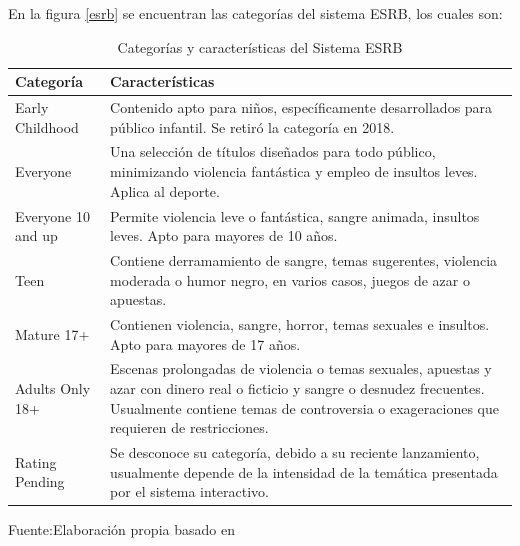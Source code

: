 En la figura \ref{esrb} se encuentran las categorías del sistema ESRB, los cuales son:
\begin{table}[t]
	\begin{center}
		\begin{tabular}{| m{4cm} | m{10cm} | }
			\hline Categoría & Características \\ \hline
			Early Childhood & Contenido apto para niños, específicamente desarrollados para
			público infantil. Se retiró la categoría en 2018. \\ \hline
			Everyone & Una selección de títulos diseñados para todo público, minimizando
			violencia fantástica y empleo de insultos leves. Aplica al deporte. \\ \hline
			Everyone 10 and up & Permite violencia leve o fantástica, sangre animada, insultos leves. Apto para mayores de 10 años. \\ \hline
			Teen & Contiene derramamiento de sangre, temas sugerentes, violencia moderada
			o humor negro, en varios casos, juegos de azar o apuestas. \\ \hline
			Mature 17+ & Contienen violencia, sangre, horror, temas sexuales e insultos. Apto
			para mayores de 17 años. \\ \hline
			Adults Only 18+ & Escenas prolongadas de violencia o temas sexuales, apuestas y
			azar con dinero real o ficticio y sangre o desnudez frecuentes. Usualmente contiene
			temas de controversia o exageraciones que requieren de restricciones. \\ \hline
			Rating Pending & Se desconoce su categoría, debido a su reciente lanzamiento,
			usualmente depende de la intensidad de la temática presentada por el sistema
			interactivo. \\ \hline

		\end{tabular}
		\caption{Categorías y características del Sistema ESRB}
		\footnotesize Fuente:Elaboración propia basado en \cite{esrb}
	\end{center}
\end{table}


